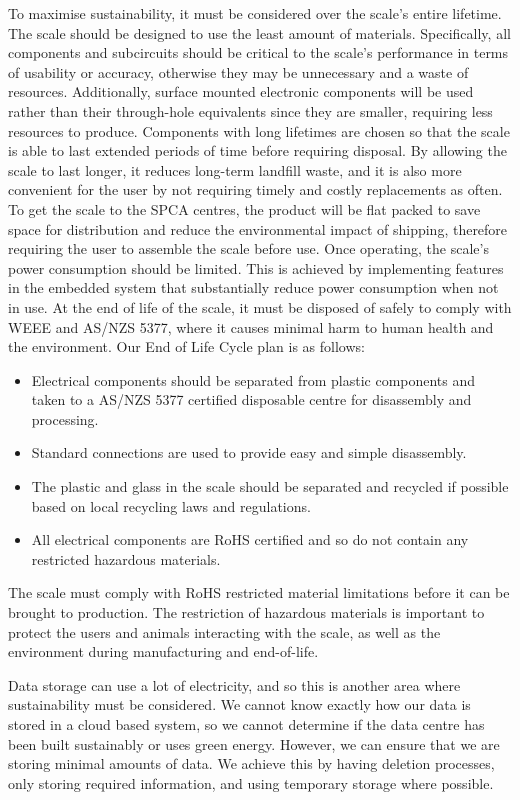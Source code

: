 To maximise sustainability, it must be considered over the scale's entire lifetime. The scale should be designed to use the least amount of materials. Specifically, all components and subcircuits should be critical to the scale's performance in terms of usability or accuracy, otherwise they may be unnecessary and a waste of resources. Additionally, surface mounted electronic components will be used rather than their through-hole equivalents since they are smaller, requiring less resources to produce. Components with long lifetimes are chosen so that the scale is able to last extended periods of time before requiring disposal. By allowing the scale to last longer, it reduces long-term landfill waste, and it is also more convenient for the user by not requiring timely and costly replacements as often. To get the scale to the SPCA centres, the product will be flat packed to save space for distribution and reduce the environmental impact of shipping, therefore requiring the user to assemble the scale before use. Once operating, the scale's power consumption should be limited. This is achieved by implementing features in the embedded system that substantially reduce power consumption when not in use. At the end of life of the scale, it must be disposed of safely to comply with WEEE and AS/NZS 5377, where it causes minimal harm to human health and the environment. Our End of Life Cycle plan is as follows: 
\begin{itemize}
	\item Electrical components should be separated from plastic components and taken to a AS/NZS 5377 certified disposable centre for disassembly and processing. 
	\item Standard connections are used to provide easy and simple disassembly. 
	\item The plastic and glass in the scale should be separated and recycled if possible based on local recycling laws and regulations. 
	\item All electrical components are RoHS certified and so do not contain any restricted hazardous materials. 
\end{itemize}

The scale must comply with RoHS restricted material limitations before it can be brought to production. The restriction of hazardous materials is important to protect the users and animals interacting with the scale, as well as the environment during manufacturing and end-of-life.

Data storage can use a lot of electricity, and so this is another area where sustainability must be considered. We cannot know exactly how our data is stored in a cloud based system, so we cannot determine if the data centre has been built sustainably or uses green energy. However, we can ensure that we are storing minimal amounts of data. We achieve this by having deletion processes, only storing required information, and using temporary storage where possible. 


